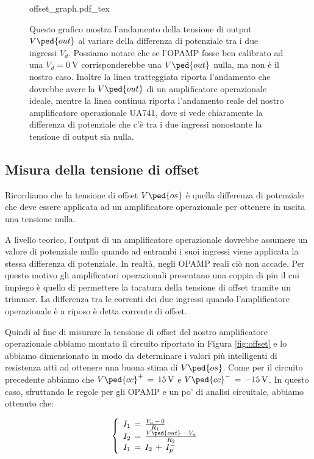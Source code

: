 \begin{SCfigure}
	\def\svgwidth{0.5\textwidth}
    {offset_graph.pdf_tex}
    \caption{Questo grafico mostra l'andamento della tensione di output $V\ped{out}$ al variare della differenza di potenziale tra i due ingressi $V_d$. Possiamo notare che se l'OPAMP fosse ben calibrato ad una $V_d=\SI{0}{\volt}$ corrisponderebbe una $V\ped{out}$ nulla, ma non è il nostro caso. Inoltre la linea tratteggiata riporta l'andamento che dovrebbe avere la $V\ped{out}$ di un amplificatore operazionale ideale, mentre la linea continua riporta l'andamento reale del nostro amplificatore operazionale UA741, dove si vede chiaramente la differenza di potenziale che c'è tra i due ingressi nonostante la tensione di output sia nulla.}
    \label{fig:plot_Vd}
\end{SCfigure}

\subsection*{Misura della tensione di offset}

Ricordiamo che la tensione di offset $V\ped{os}$ è quella differenza di potenziale che deve essere applicata ad un amplificatore operazionale per ottenere in uscita una tensione nulla.

A livello teorico, l'output di un amplificatore operazionale dovrebbe assumere un valore di potenziale nullo quando ad entrambi i suoi ingressi viene applicata la stessa differenza di potenziale. In realtà, negli OPAMP reali ciò non accade. Per questo motivo gli amplificatori operazionali presentano una coppia di pin il cui impiego è quello di permettere la taratura della tensione di offset tramite un trimmer. La differenza tra le correnti dei due ingressi quando l'amplificatore operazionale è a riposo è detta corrente di offset.

Quindi al fine di misurare la tensione di offset del nostro amplificatore operazionale abbiamo montato il circuito riportato in Figura \ref{fig:offset} e lo abbiamo dimensionato in modo da determinare i valori più intelligenti di resistenza atti ad ottenere una buona stima di $V\ped{os}$.
Come per il circuito precedente abbiamo che $V\ped{cc}^+\,=\,\SI{+15}{\volt}$ e $V\ped{cc}^-\,=\,\SI{-15}{\volt}$.
In questo caso, sfruttando le regole per gli OPAMP e un po' di analisi circuitale, abbiamo ottenuto che:

\begin{equation}
	\left\{
  \begin{array}{l l l}
    I_1\,=\,\frac{V_a\,-\,0}{R_1}\\
    I_2\,=\,\frac{V\ped{out}\,-\,V_a}{R_2}\\
    I_1\,=\,I_2\,+\,I_{p}^-
  \end{array} \right.\
  \label{eq:sistema}
\end{equation}


